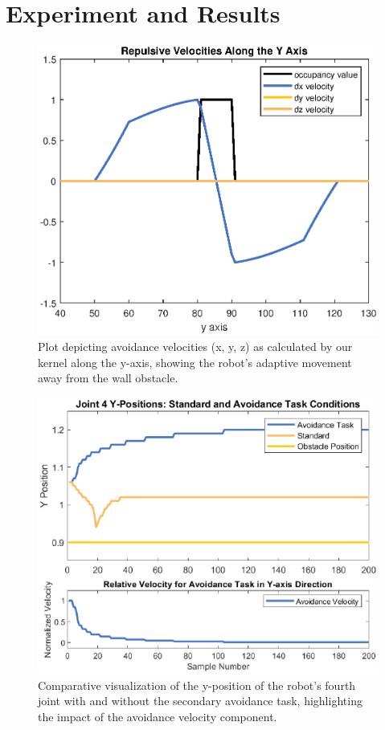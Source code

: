 \documentclass[a4paper]{article}
\begin{document}
\section{Experiment and Results}
	 	  
\begin{figure}[htbp]
	\centering
	\includegraphics[width=1.0\linewidth]{Repulsive-Velocities-Along-the-Y-Axis-wide.eps}
	\caption{Plot depicting avoidance velocities (x, y, z) as calculated by our kernel along the y-axis, showing the robot's adaptive movement away from the wall obstacle.}
	\label{y axis avoidance values}
\end{figure}

\begin{figure}[htbp]
	\centering
	\includegraphics[width=1.0\linewidth]{Y-Positions.eps}
	\caption{Comparative visualization of the y-position of the robot's fourth joint with and without the secondary avoidance task, highlighting the impact of the avoidance velocity component.}
	\label{4 th joint plot}
\end{figure}
\end{document}
